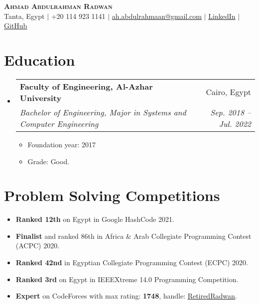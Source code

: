 \documentclass[letterpaper,11pt]{article}
\makeatletter
\newcommand{\resumeItem}[1]{
  \item\small{
    {#1 \vspace{-2pt}}
  }
}
\newcommand{\resumeSubheading}[4]{
  \vspace{-2pt}\item
    \begin{tabular*}{0.97\textwidth}[t]{l@{\extracolsep{\fill}}r}
      \textbf{#1} & #2 \\
      \textit{\small#3} & \textit{\small #4} \\
    \end{tabular*}\vspace{-7pt}
}
\newcommand{\resumeSubHeadingListStart}{\begin{itemize}[leftmargin=0.15in, label={}]}
\newcommand{\resumeSubHeadingListEnd}{\end{itemize}}
\newcommand{\resumeItemListStart}{\begin{itemize}}
\newcommand{\resumeItemListEnd}{\end{itemize}\vspace{-5pt}}
\makeatother
\begin{document}

\begin{center}
    \textbf{\Huge \scshape Ahmad Abdulrahman Radwan} \\ \vspace{1pt}
    \small Tanta, Egypt $|$
    \small +20 114 923 1141 $|$ \href{mailto:ah.abdulrahmaan@gmail.com}{\underline{ah.abdulrahmaan@gmail.com}} $|$ 
    \href{https://linkedin.com/in/ahmad-abdulrahmaan}{\underline{LinkedIn}} $|$
    \href{https://github.com/AHR9N}{\underline{GitHub}}
\end{center}

\section{Education}
  \resumeSubHeadingListStart
    \resumeSubheading
      {Faculty of Engineering, Al-Azhar University}{Cairo, Egypt}
      {Bachelor of Engineering, Major in Systems and Computer Engineering}{Sep. 2018 -- Jul. 2022}
      \resumeItemListStart
        \resumeItem{Foundation year: 2017}
        \resumeItem{Grade: Good.}
      \resumeItemListEnd
  \resumeSubHeadingListEnd

\section{Problem Solving Competitions}
    \resumeItemListStart
        \resumeItem{\textbf{Ranked 12th} on Egypt in Google HashCode 2021.}
        \resumeItem{\textbf{Finalist} and ranked 86th in Africa \& Arab Collegiate Programming Contest (ACPC) 2020.}
        \resumeItem{\textbf{Ranked 42nd} in Egyptian Collegiate Programming Contest (ECPC) 2020.}
        \resumeItem{\textbf{Ranked 3rd} on Egypt in IEEEXtreme 14.0 Programming Competition.}
        \resumeItem{\textbf{Expert} on CodeForces with max rating: \textbf{1748}, handle: \href{https://codeforces.com/profile/RetiredRadwan}{\underline{RetiredRadwan}}.}
      \resumeItemListEnd

\end{document}
